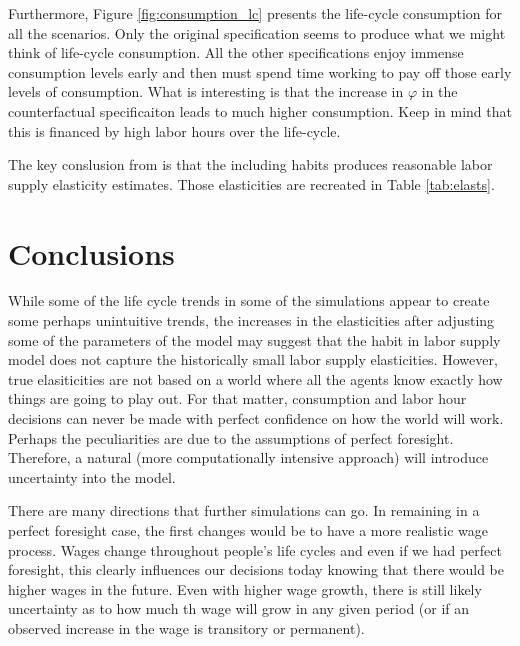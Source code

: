 \documentclass[ProjectMMD]{subfiles}
\begin{document}
\renewcommand{\figName}{consumption_lc}
\renewcommand{\figFile}{\figName}
\hypertarget{\figFile}{}

Furthermore, Figure \ref{fig:consumption_lc} presents the life-cycle consumption for all the scenarios. Only the original specification seems to produce what we might think of life-cycle consumption. All the other specifications enjoy immense consumption levels early and then must spend time working to pay off those early levels of consumption. What is interesting is that the increase in $\varphi$ in the counterfactual specificaiton leads to much higher consumption. Keep in mind that this is financed by high labor hours over the life-cycle. 


The key conslusion from \cite{bover1991relaxing} is that the including habits produces reasonable labor supply elasticity estimates. Those elasticities are recreated in Table \ref{tab:elasts}. 




\hypertarget{Conclusions}{}
\section{Conclusions}

While some of the life cycle trends in some of the simulations appear to create some perhaps unintuitive trends, the increases in the elasticities after adjusting some of the parameters of the model may suggest that the habit in labor supply model does not capture the historically small labor supply elasticities. However, true elasiticities are not based on a world where all the agents know exactly how things are going to play out. For that matter, consumption and labor hour decisions can never be made with perfect confidence on how the world will work. Perhaps the peculiarities are due to the assumptions of perfect foresight. Therefore, a natural (more computationally intensive approach) will introduce uncertainty into the model.


There are many directions that further simulations can go. In remaining in a perfect foresight case, the first changes would be to have a more realistic wage process. Wages change throughout people's life cycles and even if we had perfect foresight, this clearly influences our decisions today knowing that there would be higher wages in the future. Even with higher wage growth, there is still likely uncertainty as to how much th wage will grow in any given period (or if an observed increase in the wage is transitory or permanent). 
\end{document}
